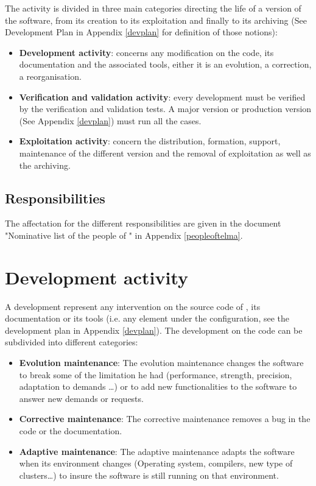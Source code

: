 The \telemacsystem activity is divided in three main categories directing the life of a
version of the software, from its creation to its exploitation and finally to
its archiving (See Development Plan in Appendix \ref{devplan} for definition of those
notions):
\begin{itemize}
\item \textbf{Development activity}: concerns any modification on the code, its
documentation and the associated tools, either it is an evolution, a
correction, a reorganisation.
\item \textbf{Verification and validation activity}: every development must be
verified by the verification and validation tests. A major version or
production version (See Appendix \ref{devplan}) must run all the cases.
\item \textbf{Exploitation activity}: concern the distribution, formation,
support, maintenance of the different version and the removal of exploitation
as well as the archiving.
\end{itemize}

\subsection{Responsibilities}

The affectation for the different responsibilities are given in the document
"Nominative list of the people of \telemacsystem" in Appendix \ref{peopleoftelma}.

\section{Development activity}

A development represent any intervention on the source code of \telemacsystem, its
documentation or its tools (i.e. any element under the configuration, see the
development plan in Appendix \ref{devplan}). The development on the code can be
subdivided into different categories: 
\begin{itemize}
\item \textbf{Evolution maintenance}: The evolution maintenance changes the
software to break some of the limitation he had (performance, strength,
precision, adaptation to demands \ldots) or to add new functionalities to the
software to answer new demands or requests.
\item \textbf{Corrective maintenance}: The corrective maintenance removes a bug
in the code or the documentation.
\item \textbf{Adaptive maintenance}: The adaptive maintenance adapts the
software when its environment changes (Operating system, compilers, new type of
clusters\ldots) to insure the software is still running on that environment.
\end{itemize}


